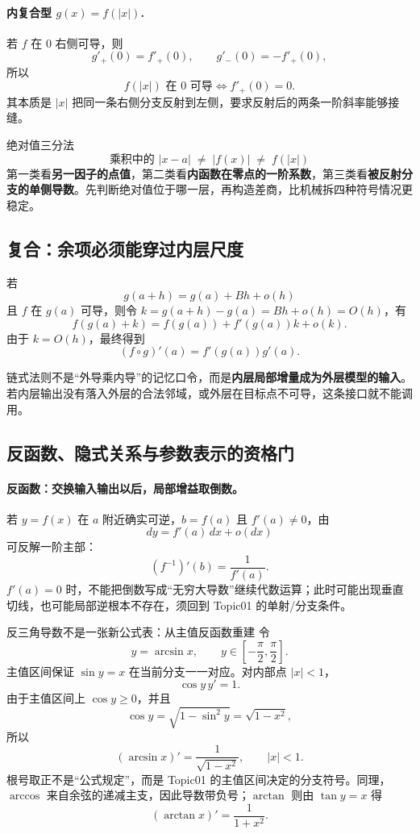 \documentclass[11pt,a4paper]{ctexart}
\begin{document}
\paragraph{内复合型 $g(x)=f(\lvert x\rvert)$.}
若 $f$ 在 $0$ 右侧可导，则
\[
g'_+(0)=f'_+(0),\qquad g'_-(0)=-f'_+(0),
\]
所以
\[
\boxed{f(\lvert x\rvert)\text{ 在 }0\text{ 可导}\iff f'_+(0)=0}.
\]
其本质是 $\lvert x\rvert$ 把同一条右侧分支反射到左侧，要求反射后的两条一阶斜率能够接缝。

\begin{corebox}{绝对值三分法}
\[
\boxed{\text{乘积中的 }\lvert x-a\rvert\;\neq\;\lvert f(x)\rvert\;\neq\;f(\lvert x\rvert)}
\]
第一类看\textbf{另一因子的点值}，第二类看\textbf{内函数在零点的一阶系数}，第三类看\textbf{被反射分支的单侧导数}。先判断绝对值位于哪一层，再构造差商，比机械拆四种符号情况更稳定。
\end{corebox}

\subsection{复合：余项必须能穿过内层尺度}

若
\[
g(a+h)=g(a)+Bh+o(h)
\]
且 $f$ 在 $g(a)$ 可导，则令 $k=g(a+h)-g(a)=Bh+o(h)=O(h)$，有
\[
f(g(a)+k)=f(g(a))+f'(g(a))k+o(k).
\]
由于 $k=O(h)$，最终得到
\[
(f\circ g)'(a)=f'(g(a))g'(a).
\]

链式法则不是“外导乘内导”的记忆口令，而是\textbf{内层局部增量成为外层模型的输入}。若内层输出没有落入外层的合法邻域，或外层在目标点不可导，这条接口就不能调用。

\subsection{反函数、隐式关系与参数表示的资格门}

\paragraph{反函数：交换输入输出以后，局部增益取倒数。}
若 $y=f(x)$ 在 $a$ 附近确实可逆，$b=f(a)$ 且 $f'(a)\ne0$，由
\[
dy=f'(a)\,dx+o(dx)
\]
可反解一阶主部：
\[
(f^{-1})'(b)=\frac1{f'(a)}.
\]
$f'(a)=0$ 时，不能把倒数写成“无穷大导数”继续代数运算；此时可能出现垂直切线，也可能局部逆根本不存在，须回到 Topic01 的单射/分支条件。

\begin{examplebox}{反三角导数不是一张新公式表：从主值反函数重建}
令
\[
y=\arcsin x,
\qquad y\in\left[-\frac\pi2,\frac\pi2\right].
\]
主值区间保证 $\sin y=x$ 在当前分支一一对应。对内部点 $\lvert x\rvert<1$，
\[
\cos y\,y'=1.
\]
由于主值区间上 $\cos y\ge0$，并且
\[
\cos y=\sqrt{1-\sin^2y}=\sqrt{1-x^2},
\]
所以
\[
\boxed{(\arcsin x)'=\frac1{\sqrt{1-x^2}}},\qquad \lvert x\rvert<1.
\]
根号取正不是“公式规定”，而是 Topic01 的主值区间决定的分支符号。同理，$\arccos$ 来自余弦的递减主支，因此导数带负号；$\arctan$ 则由 $\tan y=x$ 得
\[
\boxed{(\arctan x)'=\frac1{1+x^2}}.
\]
\end{examplebox}
\end{document}

